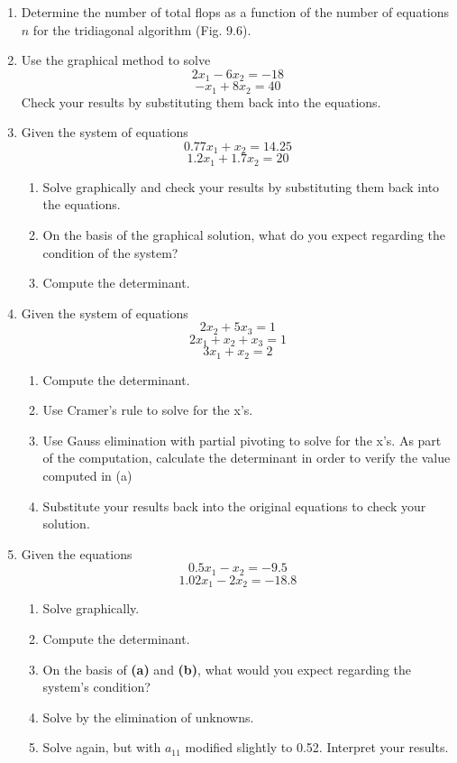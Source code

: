 \documentclass[../main.tex]{subfiles}
\begin{document}
\begin{multicols}{2}
\begin{enumerate}
	\item Determine the number of total flops as a function of the number of equations $n$ for the tridiagonal algorithm (Fig. 9.6).
	\item Use the graphical method to solve
		$$2x_{1}-6x_{2}=-18$$
		$$-x_{1}+8x_{2}=40$$
		Check your results by substituting them back into the equations.
	\item Given the system of equations
		$$0.77x_{1}+x_{2}=14.25$$
		$$1.2x_{1}+1.7x_{2}=20$$
		\begin{enumerate}
			\item Solve graphically and check your results by substituting them back into the equations.
			\item On the basis of the graphical solution, what do you expect regarding the condition of the system?
			\item Compute the determinant.
		\end{enumerate}
	\item Given the system of equations
		$$2x_{2}+5x_{3}=1$$
		$$2x_{1}+x_{2}+x_{3}=1$$
		$$3x_{1}+x_{2}=2$$
		\begin{enumerate}
			\item Compute the determinant.
			\item Use Cramer’s rule to solve for the x’s.
			\item Use Gauss elimination with partial pivoting to solve for the x’s. As part of the computation, calculate the determinant in order to verify the value computed in (a)
			\item Substitute your results back into the original equations to check your solution.
		\end{enumerate}
	\item Given the equations
		$$0.5x_{1}-x_{2}=-9.5$$
		$$1.02x_{1}-2x_{2}=-18.8$$
		\begin{enumerate}
			\item Solve graphically.
			\item Compute the determinant.
			\item On the basis of \textbf{(a)} and \textbf{(b)}, what would you expect regarding the system’s condition?
			\item Solve by the elimination of unknowns.
			\item Solve again, but with $a_{11}$ modified slightly to 0.52. Interpret your results.
		\end{enumerate}

\end{enumerate}
\end{multicols}
\end{document}
